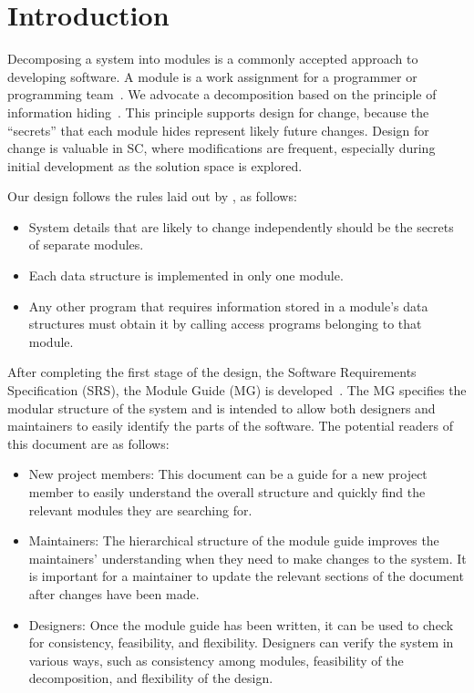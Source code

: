 \documentclass[12pt, titlepage]{article}
\begin{document}
\newpage

\tableofcontents

\listoftables

\listoffigures

\newpage


\section{Introduction}

Decomposing a system into modules is a commonly accepted approach to developing
software.  A module is a work assignment for a programmer or programming
team~\citep{ParnasEtAl1984}.  We advocate a decomposition
based on the principle of information hiding~\citep{Parnas1972a}.  This
principle supports design for change, because the ``secrets'' that each module
hides represent likely future changes.  Design for change is valuable in SC,
where modifications are frequent, especially during initial development as the
solution space is explored.  

Our design follows the rules laid out by \citet{ParnasEtAl1984}, as follows:
\begin{itemize}
\item System details that are likely to change independently should be the
  secrets of separate modules.
\item Each data structure is implemented in only one module.
\item Any other program that requires information stored in a module's data
  structures must obtain it by calling access programs belonging to that module.
\end{itemize}

After completing the first stage of the design, the Software Requirements
Specification (SRS), the Module Guide (MG) is developed~\citep{ParnasEtAl1984}. The MG
specifies the modular structure of the system and is intended to allow both
designers and maintainers to easily identify the parts of the software.  The
potential readers of this document are as follows:

\begin{itemize}
\item New project members: This document can be a guide for a new project member
  to easily understand the overall structure and quickly find the
  relevant modules they are searching for.
\item Maintainers: The hierarchical structure of the module guide improves the
  maintainers' understanding when they need to make changes to the system. It is
  important for a maintainer to update the relevant sections of the document
  after changes have been made.
\item Designers: Once the module guide has been written, it can be used to
  check for consistency, feasibility, and flexibility. Designers can verify the
  system in various ways, such as consistency among modules, feasibility of the
  decomposition, and flexibility of the design.
\end{itemize}
\end{document}
